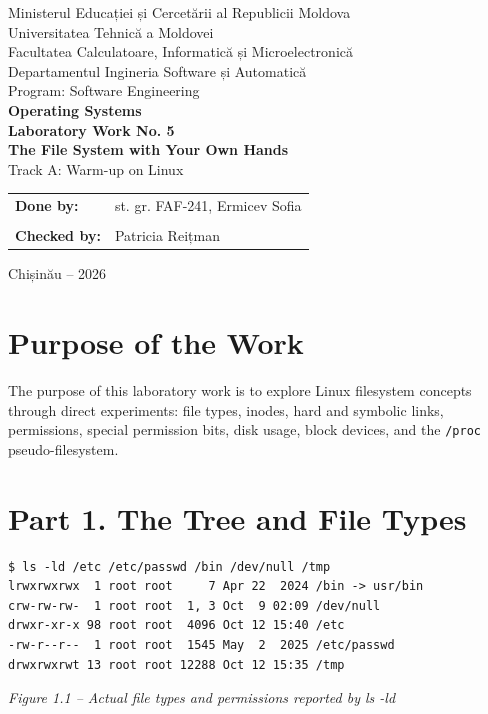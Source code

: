 \documentclass[12pt,a4paper]{article}
\newcommand{\figcap}[1]{\begin{center}\small\textit{#1}\end{center}\vspace{0.4em}}
\begin{document}
\begin{titlepage}
\begin{center}
{\large Ministerul Educației și Cercetării al Republicii Moldova}\\[0.3cm]
{\large Universitatea Tehnică a Moldovei}\\[0.3cm]
{\large Facultatea Calculatoare, Informatică și Microelectronică}\\[0.3cm]
{\large Departamentul Ingineria Software și Automatică}\\[0.3cm]
{\large Program: Software Engineering}\\[2.0cm]
{\Large \textbf{Operating Systems}}\\[0.8cm]
{\LARGE \textbf{Laboratory Work No. 5}}\\[0.5cm]
{\Large \textbf{The File System with Your Own Hands}}\\[0.35cm]
{\large Track A: Warm-up on Linux}
\vfill
\begin{flushright}
\begin{tabular}{ll}
\textbf{Done by:} & st. gr. FAF-241, Ermicev Sofia \\
\\
\textbf{Checked by:} & Patricia Reițman
\end{tabular}
\end{flushright}
\vfill
{\large Chișinău -- 2026}
\end{center}
\end{titlepage}
\tableofcontents
\newpage

\section{Purpose of the Work}
The purpose of this laboratory work is to explore Linux filesystem concepts through direct experiments: file types, inodes, hard and symbolic links, permissions, special permission bits, disk usage, block devices, and the \texttt{/proc} pseudo-filesystem.

\section{Part 1. The Tree and File Types}
\begin{lstlisting}
$ ls -ld /etc /etc/passwd /bin /dev/null /tmp
lrwxrwxrwx  1 root root     7 Apr 22  2024 /bin -> usr/bin
crw-rw-rw-  1 root root  1, 3 Oct  9 02:09 /dev/null
drwxr-xr-x 98 root root  4096 Oct 12 15:40 /etc
-rw-r--r--  1 root root  1545 May  2  2025 /etc/passwd
drwxrwxrwt 13 root root 12288 Oct 12 15:35 /tmp
\end{lstlisting}
\figcap{Figure 1.1 -- Actual file types and permissions reported by ls -ld}
\end{document}
